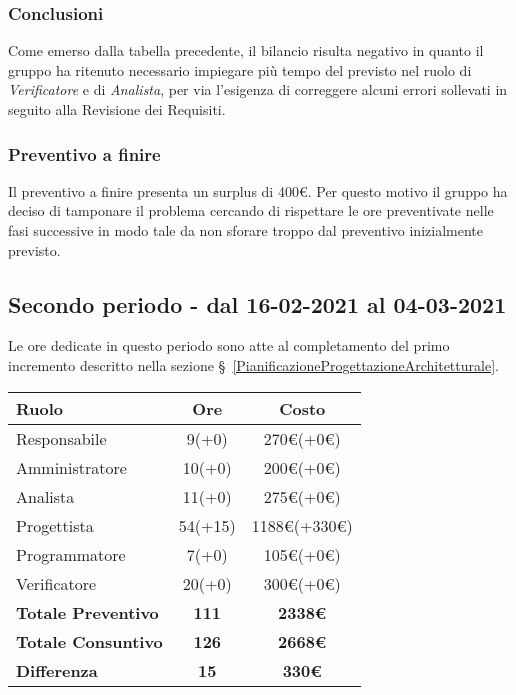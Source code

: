 {{{\subsubsection{Conclusioni}
Come emerso dalla tabella precedente, il bilancio risulta negativo in quanto il gruppo ha ritenuto necessario impiegare più tempo del previsto nel ruolo di \textit{Verificatore} e di \textit{Analista}, per via l'esigenza di correggere alcuni errori sollevati in seguito alla Revisione dei Requisiti. 

\subsubsection{Preventivo a finire}
Il preventivo a finire presenta un surplus di 400\euro. Per questo motivo il gruppo ha deciso di tamponare il problema cercando di rispettare le ore preventivate nelle fasi successive in modo tale da non sforare troppo dal preventivo inizialmente previsto.

\subsection{Secondo periodo - dal 16-02-2021 al 04-03-2021 }\label{ConsuntivoPeriodoDiProgettazioneArchitetturaleTechnologyBaselinePrimoIncremento}

Le ore dedicate in questo periodo sono atte al completamento del primo incremento descritto nella sezione \S~\ref{PianificazioneProgettazioneArchitetturale}.

\quad
\def\tabularxcolumn#1{m{#1}}
{
	\begin{center}
		\renewcommand{\arraystretch}{1.4}
		\begin{tabularx}{10cm}{|X|c|c|}
			\hline
			\rowcolor{airforceblue}
			\textbf{Ruolo} & \textbf{Ore} & \textbf{Costo}\\
			\hline
			Responsabile & 9(+0) & 270\euro(+0\euro)\\
			\hline
			Amministratore & 10(+0) & 200\euro(+0\euro)\\
			\hline
			Analista & 11(+0) & 275\euro(+0\euro)\\
			\hline
			Progettista & 54(+15) & 1188\euro(+330\euro)\\
			\hline
			Programmatore & 7(+0) & 105\euro(+0\euro)\\
			\hline
			Verificatore & 20(+0) & 300\euro(+0\euro)\\
			\hline
			\textbf{Totale Preventivo} & \textbf{111} & \textbf{2338\euro}\\
			\hline
			\textbf{Totale Consuntivo} & \textbf{126} & \textbf{2668\euro}\\
			\hline
			\textbf{Differenza} & \textbf{15} & \textbf{330\euro}
		\end{tabularx}
	\end{center}

}}}}
